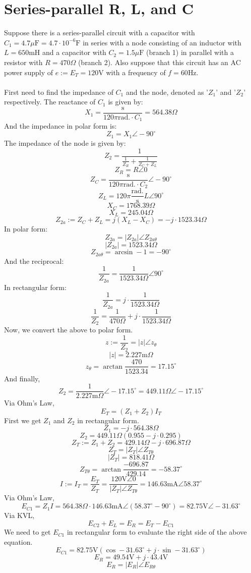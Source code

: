 \documentclass{article}
\begin{document}
	\section[SeriesParallel]{Series-parallel R, L, and C}
	Suppose there is a series-parallel circuit with a capacitor with 
	$C_1=4.7\mu\text{F}=4.7\cdot10^{-6}\text{F}$ in series with a node 
	consisting of an inductor with $L=650\text{mH}$ and a capacitor with 
	$C_2=1.5\mu\text{F}$ (branch 1) in parallel with a resistor with 
	$R=470\Omega$ (branch 2).  Also suppose that this circuit has an AC power 
	supply of $e:=E_T=120\text{V}$ with a frequency of $f=60\text{Hz}$.\\ \\
	First need to find the impedance of $C_1$ and the node, denoted as '$Z_1$' 
	and '$Z_2$' respectively.  The reactance of $C_1$ is given by:
	$$ X_1 = \frac{\text{s}}{120\pi \text{rad.} \cdot C_1} = 564.38\Omega$$
	And the impedance in polar form is:
	$$ Z_1 = X_1\angle-90^{\circ}$$
	The impedance of the node is given by:
	$$ Z_2 = \frac{1}{\frac{1}{Z_R} + \frac{1}{Z_C + Z_L}}$$
	$$ Z_R = R\angle0$$
	$$ Z_C = \frac{\text{s}}{120\pi \text{rad.} \cdot C_2}\angle-90^{\circ}$$
	$$ Z_L = 120\pi \frac{\text{rad.}}{\text{s}}L \angle 90^{\circ}$$
	$$ X_C = 1768.39 \Omega$$
	$$ X_L = 245.04\Omega$$
	$$ Z_{2a}:=Z_C+Z_L = j (X_L-X_C) = -j \cdot 1523.34\Omega$$
	In polar form:
	$$ Z_{2a} = |Z_{2a}|\angle Z_{2a\theta}$$
	$$ |Z_{2a}| = 1523.34\Omega$$
	$$ Z_{2a\theta} = \arcsin -1 = -90^{\circ}$$
	And the reciprocal:
	$$ \frac{1}{Z_{2a}} = \frac{1}{1523.34\Omega}\angle90^{\circ}$$
	In rectangular form:
	$$ \frac{1}{Z_{2a}} = j \cdot \frac{1}{1523.34\Omega}$$
	$$ \frac{1}{Z_2} = \frac{1}{470\Omega} +j \cdot \frac{1}{1523.34\Omega} $$
	Now, we convert the above to polar form.
	$$ z:=\frac{1}{Z_2} = |z|\angle z_\theta$$
	$$ |z|=2.227\text{m}\Omega$$
	$$ z_\theta = \arctan \frac{470}{1523.34} = 17.15^{\circ}$$
	And finally,
	$$ Z_2 = \frac{1}{2.227\text{m}\Omega} \angle -17.15^{\circ} = 
	449.11\Omega\angle -17.15^{\circ}$$
	Via Ohm's Law,
	$$ E_T = (Z_1+Z_2)I_T$$
	First we get $Z_1$ and $Z_2$ in rectangular form.
	$$ Z_1 = - j\cdot 564.38 \Omega$$
	$$ Z_2 = 449.11\Omega(0.955-j\cdot0.295)$$
	$$ Z_T:= Z_1+Z_2 = 429.14\Omega - j \cdot 696.87 \Omega$$
	$$ Z_T=|Z_T|\angle Z_{T\theta}$$
	$$ |Z_T| = 818.41 \Omega$$
	$$ Z_{T\theta} = \arctan \frac{-696.87}{429.14} = -58.37^{\circ}$$
	$$ I:=I_T=\frac{E_T}{Z_T} = \frac{120\text{V}\angle0}{|Z_T|\angle 
	Z_{T\theta}} = 146.63\text{mA}\angle 58.37^{\circ}$$
	Via Ohm's Law,
	$$ E_{C1} = Z_1I = 564.38\Omega\cdot 
	146.63\text{mA}\angle(58.37^{\circ}-90^{\circ}) = 
	82.75\text{V}\angle-31.63^{\circ}$$
	Via KVL,
	$$ E_{C2} + E_L = E_R = E_T-E_{C1}$$
	We need to get $E_{C1}$ in rectangular form to evaluate the right side of 
	the 
	above equation.
	$$ E_{C1} = 82.75\text{V}(\cos -31.63^{\circ} + j \cdot \sin 
	-31.63^{\circ})$$
	$$ E_R = 49.54\text{V} + j\cdot 43.4\text{V}$$
	$$ E_R=|E_R|\angle E_{R\theta}$$
\end{document}
